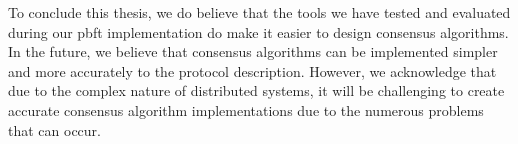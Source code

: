 To conclude this thesis, we do believe that the tools we have tested and evaluated during our \ac{pbft} implementation do make it easier to design consensus algorithms. In the future, we believe that consensus algorithms can be implemented simpler and more accurately to the protocol description. However, we acknowledge that due to the complex nature of distributed systems, it will be challenging to create accurate consensus algorithm implementations due to the numerous problems that can occur.
